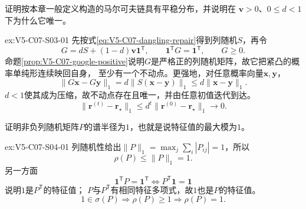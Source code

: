 \begin{SLChapterExercisePairSection}
\begin{exercise}\label{ex:V5-C07-S03-01}
证明按本章一般定义构造的\PageRank{}马尔可夫链具有平稳分布，并说明在
$\boldsymbol v>0$、$0\le d<1$下为什么它唯一。
\end{exercise}
\ifSLFullEdition
{}\label{sol:V5-C07-S03-01}
\begin{chapterexercisesolution}{ex:V5-C07-S03-01}
先按式\eqref{eq:V5-C07-dangling-repair}得到列随机$S$，再令
\[
G=dS+(1-d)\boldsymbol v\boldsymbol1^{\mathsf T},\qquad
\boldsymbol1^{\mathsf T}G=\boldsymbol1^{\mathsf T},\qquad G\ge0.
\]
命题\ref{prop:V5-C07-google-positive}说明$G$是严格正的列随机矩阵，故它把紧凸的概率单纯形连续映回自身，
至少有一个不动点。更强地，对任意概率向量$\boldsymbol x,\boldsymbol y$，
\[
\|G\boldsymbol x-G\boldsymbol y\|_1
=d\|S(\boldsymbol x-\boldsymbol y)\|_1
\le d\|\boldsymbol x-\boldsymbol y\|_1.
\]
$d<1$使其成为压缩，故不动点存在且唯一，并由任意初值迭代到达。
\[
\|\boldsymbol r^{(t)}-\boldsymbol r_\star\|_1
\le d^t\|\boldsymbol r^{(0)}-\boldsymbol r_\star\|_1
\longrightarrow0.
\]
\end{chapterexercisesolution}
\fi

\begin{exercise}\label{ex:V5-C07-S04-01}
证明非负列随机矩阵$P$的谱半径为$1$，也就是说特征值的最大模为$1$。
\end{exercise}
\ifSLFullEdition
{}\label{sol:V5-C07-S04-01}
\begin{chapterexercisesolution}{ex:V5-C07-S04-01}
列随机性给出$\|P\|_1=\max_j\sum_i|P_{ij}|=1$，所以
\[
\rho(P)\le\|P\|_1=1.
\]
另一方面
\[
\boldsymbol1^{\mathsf T}P=\boldsymbol1^{\mathsf T}
\Longleftrightarrow
P^{\mathsf T}\boldsymbol1=\boldsymbol1
\]
说明$1$是$P^{\mathsf T}$的特征值；
$P$与$P^{\mathsf T}$有相同特征多项式，故$1$也是$P$的特征值。
\[
1\in\sigma(P)\Longrightarrow\rho(P)\ge1
\Longrightarrow\rho(P)=1.
\]
\end{chapterexercisesolution}
\fi

\SLLectureSupplementExercises


\end{SLChapterExercisePairSection}
